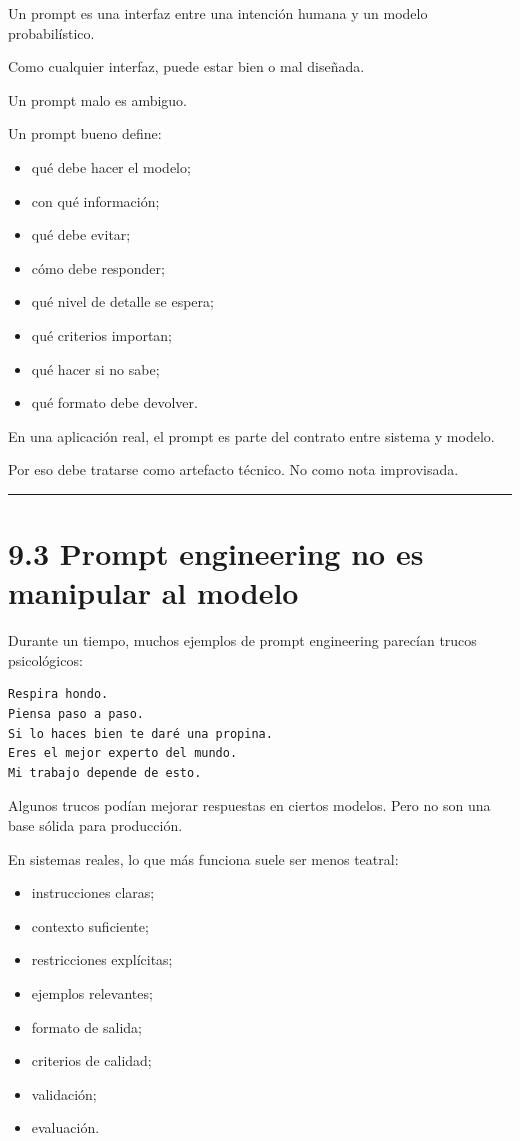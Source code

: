 Un prompt es una interfaz entre una intención humana y un modelo
probabilístico.

Como cualquier interfaz, puede estar bien o mal diseñada.

Un prompt malo es ambiguo.

Un prompt bueno define:

\begin{itemize}
\tightlist
\item
  qué debe hacer el modelo;
\item
  con qué información;
\item
  qué debe evitar;
\item
  cómo debe responder;
\item
  qué nivel de detalle se espera;
\item
  qué criterios importan;
\item
  qué hacer si no sabe;
\item
  qué formato debe devolver.
\end{itemize}

En una aplicación real, el prompt es parte del contrato entre sistema y
modelo.

Por eso debe tratarse como artefacto técnico. No como nota improvisada.

\begin{center}\rule{0.5\linewidth}{0.5pt}\end{center}

\section{9.3 Prompt engineering no es manipular al
modelo}\label{prompt-engineering-no-es-manipular-al-modelo}

Durante un tiempo, muchos ejemplos de prompt engineering parecían trucos
psicológicos:

\begin{lstlisting}
Respira hondo.
Piensa paso a paso.
Si lo haces bien te daré una propina.
Eres el mejor experto del mundo.
Mi trabajo depende de esto.
\end{lstlisting}

Algunos trucos podían mejorar respuestas en ciertos modelos. Pero no son
una base sólida para producción.

En sistemas reales, lo que más funciona suele ser menos teatral:

\begin{itemize}
\tightlist
\item
  instrucciones claras;
\item
  contexto suficiente;
\item
  restricciones explícitas;
\item
  ejemplos relevantes;
\item
  formato de salida;
\item
  criterios de calidad;
\item
  validación;
\item
  evaluación.
\end{itemize}

